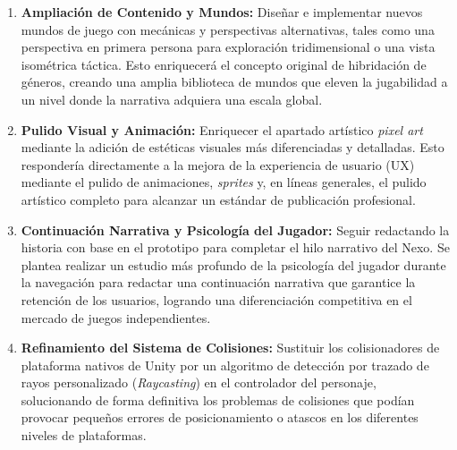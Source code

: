 \begin{enumerate}
    \item \textbf{Ampliación de Contenido y Mundos:} Diseñar e implementar nuevos mundos de juego con mecánicas y perspectivas alternativas, tales como una perspectiva en primera persona para exploración tridimensional o una vista isométrica táctica. Esto enriquecerá el concepto original de hibridación de géneros, creando una amplia biblioteca de mundos que eleven la jugabilidad a un nivel donde la narrativa adquiera una escala global.
    
    \item \textbf{Pulido Visual y Animación:} Enriquecer el apartado artístico \textit{pixel art} mediante la adición de estéticas visuales más diferenciadas y detalladas. Esto respondería directamente a la mejora de la experiencia de usuario (UX) mediante el pulido de animaciones, \textit{sprites} y, en líneas generales, el pulido artístico completo para alcanzar un estándar de publicación profesional.
    
    \item \textbf{Continuación Narrativa y Psicología del Jugador:} Seguir redactando la historia con base en el prototipo para completar el hilo narrativo del Nexo. Se plantea realizar un estudio más profundo de la psicología del jugador durante la navegación para redactar una continuación narrativa que garantice la retención de los usuarios, logrando una diferenciación competitiva en el mercado de juegos independientes.
    
    \item \textbf{Refinamiento del Sistema de Colisiones:} Sustituir los colisionadores de plataforma nativos de Unity por un algoritmo de detección por trazado de rayos personalizado (\textit{Raycasting}) en el controlador del personaje, solucionando de forma definitiva los problemas de colisiones que podían provocar pequeños errores de posicionamiento o atascos en los diferentes niveles de plataformas.
    

\end{enumerate}
